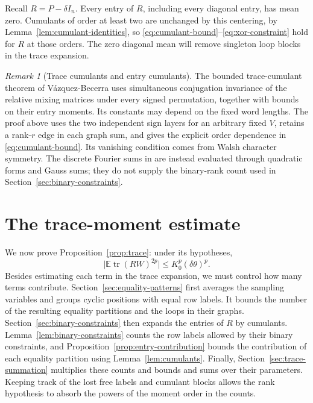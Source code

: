 \documentclass[11pt]{article}
\theoremstyle{definition}
\theoremstyle{remark}
\newtheorem*{remark}{Remark}
\theoremstyle{plain}
\newcommand{\E}{\mathbb E}
\DeclareMathOperator{\tr}{tr}
\begin{document}
Recall \(R=P-\delta I_n\). Every entry of \(R\), including every diagonal
entry, has mean zero. Cumulants of order at least two are unchanged
by this centering, by Lemma~\ref{lem:cumulant-identities}, so
\eqref{eq:cumulant-bound}--\eqref{eq:xor-constraint} hold for \(R\) at those orders.
The zero diagonal mean will remove singleton loop blocks in
the trace expansion.

\begin{remark}[Trace cumulants and entry cumulants]
The bounded trace-cumulant theorem of V\'azquez-Becerra
\cite[Lemma~6 and Theorem~7]{vazquez_becerra} uses simultaneous
conjugation invariance of the relative mixing matrices under every
signed permutation, together with bounds on their entry moments.
Its constants may depend on the fixed word lengths. The proof above
uses the two independent sign layers for an arbitrary fixed $V$,
retains a rank-$r$ edge in each graph sum, and gives the explicit
order dependence in \eqref{eq:cumulant-bound}. Its vanishing condition
comes from Walsh character symmetry. The discrete Fourier sums in
\cite[Section~3.2]{vazquez_becerra} are instead evaluated through
quadratic forms and Gauss sums; they do not supply the binary-rank
count used in Section~\ref{sec:binary-constraints}.
\end{remark}


\section{The trace-moment estimate}\label{sec:trace-proof}

We now prove Proposition~\ref{prop:trace}: under its hypotheses,
\[
 \bigl|\E\tr(RW)^{2p}\bigr|\le K_0^p(\delta\theta)^p.
\]
Besides estimating each term in the trace expansion, we must control
how many terms contribute. Section~\ref{sec:equality-patterns} first
averages the sampling variables and groups cyclic positions with equal
row labels. It bounds the number of the resulting equality partitions
and the loops in their graphs. Section~\ref{sec:binary-constraints}
then expands the entries of $R$ by cumulants. Lemma~\ref{lem:binary-constraints}
counts the row labels allowed by their binary constraints, and
Proposition~\ref{prop:entry-contribution} bounds the contribution of
each equality partition using Lemma~\ref{lem:cumulants}.
Finally, Section~\ref{sec:trace-summation} multiplies these
counts and bounds and sums over their parameters. Keeping track of
the lost free labels and cumulant blocks allows the rank hypothesis
to absorb the powers of the moment order in the counts.
\end{document}
